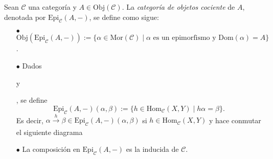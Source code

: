 \documentclass[tesis]{subfiles}
\begin{document}
\begin{Def}\label{Def: Categoría de objetos cociente}
    Sean $\mathscr{C}$ una categoría y $A\in\text{Obj}(\mathscr{C})$. La \emph{categoría de objetos cociente} de $A$, denotada por $\text{Epi}_\mathscr{C}(A,-)$, se define como sigue:

    \begin{itemize}
    
        \item[$\bullet$] $\text{Obj}(\text{Epi}_\mathscr{C}(A,-)) := \{\alpha\in\text{Mor}(\mathscr{C}) \mid \alpha \text{ es un epimorfismo y } \text{Dom}(\alpha) = A\}$.

        \item[$\bullet$] Dados  y , se define
            \[
                \text{Epi}_\mathscr{C}(A,-)(\alpha,\beta) := \{h\in\text{Hom}_\mathscr{C}(X,Y) \mid h\alpha=\beta \}.
            \] 
            Es decir, $\alpha\xrightarrow[]{h}\beta\in\text{Epi}_\mathscr{C}(A,-)(\alpha,\beta)$ si $h\in\text{Hom}_\mathscr{C}(X,Y)$ y hace conmutar el siguiente diagrama
            \begin{center}
            \end{center}
            
        \item[$\bullet$] La composición en $\text{Epi}_\mathscr{C}(A,-)$ es la inducida de $\mathscr{C}$.
    \end{itemize}
\end{Def}
\end{document}

